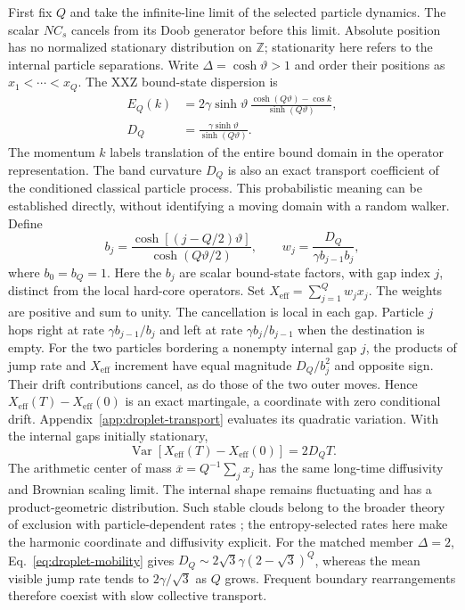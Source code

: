 \documentclass[aps,pre,reprint,amsmath,amssymb,longbibliography,floatfix]{revtex4-2}
\begin{document}
First fix $Q$ and take the infinite-line limit of the selected particle
dynamics. The scalar $NC_s$ cancels from its Doob generator before this
limit. Absolute position has no normalized stationary distribution on
$\mathbb Z$; stationarity here refers to the internal particle separations. Write
$\Delta=\cosh\vartheta>1$ and order their positions as
$x_1<\cdots<x_Q$. The XXZ bound-state dispersion is
\cite{FischbacherStolz2014,NachtergaeleSpitzerStarr2007}
\begin{align}
 E_Q(k)&=2\gamma\sinh\vartheta\,
 \frac{\cosh(Q\vartheta)-\cos k}{\sinh(Q\vartheta)},
 \label{eq:droplet-band}\\
 D_Q&=\frac{\gamma\sinh\vartheta}{\sinh(Q\vartheta)}.
 \label{eq:droplet-mobility}
\end{align}
The momentum $k$ labels translation of the entire bound domain in the
operator representation. The band curvature $D_Q$ is also an exact
transport coefficient of the conditioned classical particle process. This probabilistic meaning can be established directly,
without identifying a moving domain with a random walker. Define
\begin{equation}
 b_j=\frac{\cosh\left[(j-Q/2)\vartheta\right]}{\cosh(Q\vartheta/2)},
 \qquad
 w_j=\frac{D_Q}{\gamma b_{j-1}b_j},
 \label{eq:droplet-weights}
\end{equation}
where $b_0=b_Q=1$. Here the $b_j$ are scalar bound-state factors,
with gap index $j$, distinct from the local hard-core operators. Set
$X_{\mathrm{eff}}=\sum_{j=1}^{Q}w_jx_j$. The weights are positive and sum
to unity. The cancellation is local in each gap. Particle $j$ hops
right at rate $\gamma b_{j-1}/b_j$ and left at rate
$\gamma b_j/b_{j-1}$ when the destination is empty. For the two
particles bordering a nonempty internal gap $j$, the products of jump rate and
$X_{\mathrm{eff}}$ increment have equal magnitude $D_Q/b_j^2$ and
opposite sign. Their drift contributions cancel, as do those of the
two outer moves. Hence
$X_{\mathrm{eff}}(T)-X_{\mathrm{eff}}(0)$ is an exact martingale,
a coordinate with zero conditional drift. Appendix~\ref{app:droplet-transport}
evaluates its quadratic variation. With the
internal gaps initially stationary,
\begin{equation}
 \operatorname{Var}\left[X_{\mathrm{eff}}(T)-X_{\mathrm{eff}}(0)\right]
 =2D_QT .
 \label{eq:droplet-variance}
\end{equation}
The arithmetic center of mass $\overline x=Q^{-1}\sum_jx_j$ has the same long-time diffusivity and
Brownian scaling limit. The internal shape remains fluctuating and has a
product-geometric distribution. Such stable clouds belong to the broader
theory of exclusion with particle-dependent rates
\cite{MalyshevMenshikovPopovWade2023}; the entropy-selected rates here make
the harmonic coordinate and diffusivity explicit. For the matched member
$\Delta=2$, Eq.~\eqref{eq:droplet-mobility} gives
$D_Q\sim2\sqrt3\gamma(2-\sqrt3)^Q$, whereas the mean visible jump rate
tends to $2\gamma/\sqrt3$ as $Q$ grows. Frequent boundary rearrangements
therefore coexist with slow collective transport.
\end{document}

